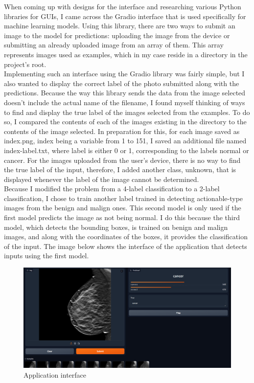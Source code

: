 When coming up with designs for the interface and researching various Python libraries for GUIs, I came across the Gradio interface that is used specifically for machine learning models. Using this library, there are two ways to submit an image to the model for predictions: uploading the image from the device or submitting an already uploaded image from an array of them. This array represents images used as examples, which in my case reside in a directory in the project's root. \\
Implementing such an interface using the Gradio library was fairly simple, but I also wanted to display the correct label of the photo submitted along with the predictions. Because the way this library sends the data from the image selected doesn't include the actual name of the filename, I found myself thinking of ways to find and display the true label of the images selected from the examples. To do so, I compared the contents of each of the images existing in the directory to the contents of the image selected. In preparation for this, for each image saved as index.png, index being a variable from 1 to 151, I saved an additional file named index-label.txt, where label is either 0 or 1, corresponding to the labels normal or cancer. For the images uploaded from the user's device, there is no way to find the true label of the input, therefore, I added another class, unknown, that is displayed whenever the label of the image cannot be determined.\\
Because I modified the problem from a 4-label classification to a 2-label classification, I chose to train another label trained in detecting actionable-type images from the benign and malign ones. This second model is only used if the first model predicts the image as not being normal. I do this because the third model, which detects the bounding boxes, is trained on benign and malign images, and along with the coordinates of the boxes, it provides the classification of the input. The image below shows the interface of the application that detects inputs using the first model.\\
\begin{figure}[ht!]
    \centering
    \includegraphics[width=0.75\linewidth]{figures/Figure16.png}
    \caption{Application interface}
    \label{fig:fig15}
\end{figure}